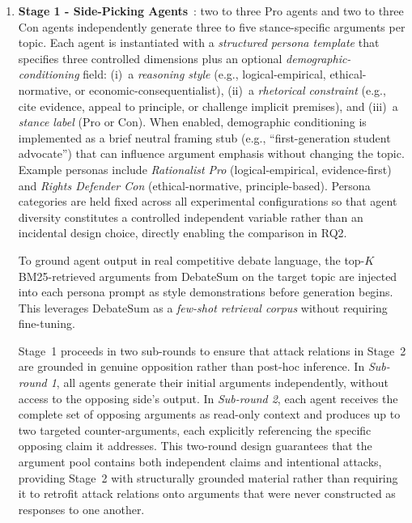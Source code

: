 \documentclass[11pt,twocolumn,letterpaper]{article}
\begin{document}
\begin{enumerate}
  \item \textbf{Stage 1 - Side-Picking Agents}~\citep{hu2025debate2write}:
        two to three Pro agents and two to three Con agents independently
        generate three to five stance-specific arguments per topic.
        Each agent is instantiated with a \textit{structured persona template}
        that specifies three controlled dimensions plus an optional
        \textit{demographic-conditioning} field: (i)~a \textit{reasoning
        style} (e.g., logical-empirical, ethical-normative, or
        economic-consequentialist), (ii)~a \textit{rhetorical constraint}
        (e.g., cite evidence, appeal to principle, or challenge implicit
        premises), and (iii)~a \textit{stance label} (Pro or Con).
        When enabled, demographic conditioning is implemented as a brief
        neutral framing stub (e.g., ``first-generation student advocate'')
        that can influence argument emphasis without changing the topic.
        Example personas include \textit{Rationalist Pro} (logical-empirical,
        evidence-first) and \textit{Rights Defender Con}
        (ethical-normative, principle-based).
        Persona categories are held fixed across all experimental configurations
        so that agent diversity constitutes a controlled independent variable
        rather than an incidental design choice, directly enabling the
        comparison in RQ2.

        To ground agent output in real competitive debate language,
        the top-$K$ BM25-retrieved arguments from DebateSum on the target
        topic are injected into each persona prompt as style demonstrations
        before generation begins. This leverages DebateSum as a
        \textit{few-shot retrieval corpus} without requiring fine-tuning.

        Stage~1 proceeds in two sub-rounds to ensure that attack relations
        in Stage~2 are grounded in genuine opposition rather than
        post-hoc inference.
        In \textit{Sub-round 1}, all agents generate their initial arguments
        independently, without access to the opposing side's output.
        In \textit{Sub-round 2}, each agent receives the complete set of
        opposing arguments as read-only context and produces up to two
        targeted counter-arguments, each explicitly referencing the specific
        opposing claim it addresses.
        This two-round design guarantees that the argument pool contains
        both independent claims and intentional attacks, providing
        Stage~2 with structurally grounded material rather than requiring
        it to retrofit attack relations onto arguments that were never
        constructed as responses to one another.


\end{enumerate}
\end{document}
